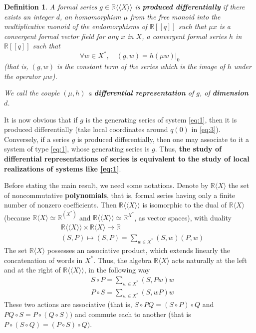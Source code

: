 \documentclass[a4paper,12pt]{article}
\newtheorem{definition}{Definition}
\newcommand{\R}{\mathbb{R}}
\newcommand{\Rx}{\R\langle X\rangle}
\newcommand{\Rxx}{\R\langle\langle X\rangle\rangle}
\begin{document}

\begin{definition}
	A formal series $g \in \Rxx$ is \textbf{produced differentially} if there exists an integer $d$, an homomorphism $\mu$ from the free monoid into the multiplicative monoid of the endomorphisms of $\R[[q]]$ such that $\mu {x}$ is a convergent formal vector field for any $x$ in $X$, a convergent formal series $h$ in $\R[[q]]$ such that
	\begin{equation*}
		\forall w \in X^*, \quad (g, w)=\left.h(\mu w)\right|_0
	\end{equation*}
	(that is, $({g}, {w})$ is the constant term of the series which is the image of ${h}$ under the operator $\mu w$).
	
	We call the couple $(\mu, h)$ a \textbf{differential representation} of $g$, of \textbf{dimension}~$d$.
\end{definition}


It is now obvious that if ${g}$ is the generating series of system \eqref{eq:1}, then it is produced differentially (take local coordinates around ${q}(0)$ in \eqref{eq:3}). Conversely, if a series ${g}$ is produced differentially, then one may associate to it a system of type \eqref{eq:1}, whose generating series is ${g}$. Thus, \textbf{the study of differential representations of series is equivalent to the study of local realizations of systems like \eqref{eq:1}}.

Before stating the main result, we need some notations. Denote by $\Rx$ the set of noncommutative \textbf{polynomials}, that is, formal series having only a finite number of nonzero coefficients. Then $\Rxx$ is isomorphic to the dual of $\Rx$ (because $\Rx \simeq \R^{(X^*)}$ and $\Rxx \simeq \R^{X^*}$, as vector spaces), with duality
\begin{equation*}
	\begin{aligned}
		& \Rxx \times \Rx \to \R \\
		& (S, P) \mapsto (S, P)=\sum_{w \in X^*} (S, w) (P, w)
	\end{aligned}
\end{equation*}
The set $\Rx$ possesses an associative product, which extends linearly the concatenation of words in $X^*$. Thus, the algebra $\Rx$ acts naturally at the left and at the right of $\Rxx$, in the following way
\begin{equation} \label{eq:4}
	\begin{aligned}
		& S \circ P=\sum_{w \in X^*}(S, P w) w \\
		& P \circ S=\sum_{w \in X^*}(S, w P) w
	\end{aligned}
\end{equation}
These two actions are associative (that is, $S \circ P Q=(S \circ P) \circ Q$ and ${PQ} \circ {S}={P} \circ({Q} \circ {S}))$ and commute each to another (that is ${P} \circ({S} \circ {Q})=({P} \circ {S}) \circ {Q})$. 
\end{document}
